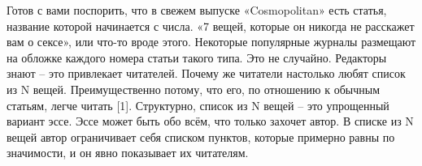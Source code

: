 \documentclass[ebook,12pt,oneside,openany]{memoir}
\begin{document}
\maketitle

Готов с вами поспорить, что в свежем выпуске «Cosmopolitan» есть
статья, название которой начинается с числа. «7 вещей, которые он
никогда не расскажет вам о сексе», или что-то вроде этого. Некоторые
популярные журналы размещают на обложке каждого номера статьи такого
типа. Это не случайно. Редакторы знают – это привлекает читателей.
Почему же читатели настолько любят список из N вещей. Преимущественно
потому, что его, по отношению к обычным статьям, легче читать [1].
Структурно, список из N вещей – это упрощенный вариант эссе. Эссе
может быть обо всём, что только захочет автор. В списке из N вещей
автор ограничивает себя списком пунктов, которые примерно равны по
значимости, и он явно показывает их читателям.
\end{document}

